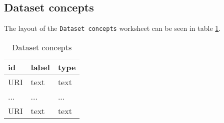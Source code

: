 \documentclass[a4paper,10pt]{article}
\begin{document}
\subsection*{Dataset concepts}
The layout of the \texttt{Dataset concepts} worksheet can be seen in table \ref{table:Dataset concepts}.
\begin{table}[!h]
  \centering
  \caption{Dataset concepts}
  \label{table:Dataset concepts}
  \begin{tabular}{|l|l|l|}
    \hline
    \textbf{id} & \textbf{label} & \textbf{type} \\ \hline
    URI         & text           & text          \\ \hline
    ...         & ...            & ...           \\ \hline
    URI         & text           & text          \\ \hline
  \end{tabular}
\end{table}
\end{document}
